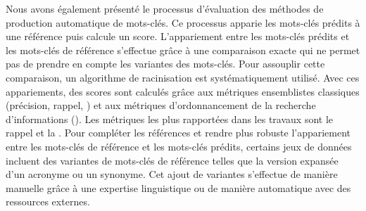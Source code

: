 Nous avons également présenté le processus d'évaluation des méthodes de production automatique de mots-clés. Ce processus apparie les mots-clés prédits à une référence puis calcule un score.
L'appariement entre les mots-clés prédits et les mots-clés de référence s'effectue grâce à une comparaison exacte qui ne permet pas de prendre en compte les variantes des mots-clés. Pour assouplir cette comparaison, un algorithme de racinisation est systématiquement utilisé.
Avec ces appariements, des scores sont calculés grâce aux métriques ensemblistes classiques (précision, rappel, \fmesure{}) et aux métriques d'ordonnancement de la recherche d'informations (\map{}). Les métriques les plus rapportées dans les travaux sont le rappel et la \fmesure{}.
Pour compléter les références et rendre plus robuste l'appariement entre les mots-clés de référence et les mots-clés prédits, certains jeux de données incluent des variantes de mots-clés de référence telles que la version expansée d'un acronyme ou un synonyme.
Cet ajout de variantes s'effectue de manière manuelle grâce à une expertise linguistique ou de manière automatique avec des ressources externes.

